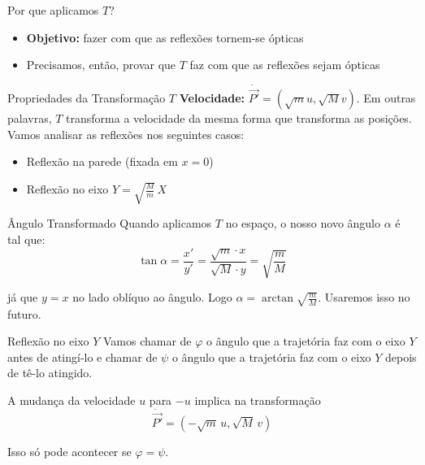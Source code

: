 \documentclass{beamer}
\begin{document}
\begin{frame}{Por que aplicamos $T$?}
  \begin{itemize}
    \item \textbf{Objetivo:} fazer com que as reflexões tornem-se ópticas
    \item Precisamos, então, provar que $T$ faz com que as reflexões sejam ópticas
  \end{itemize}
\end{frame}

\begin{frame}{Propriedades da Transformação $T$}
  \textbf{Velocidade:} ${\dot{\vec{P'}}}=(\sqrt{m}u,\sqrt{M}v)$. Em outras palavras, $T$ transforma a velocidade da mesma
  forma que transforma as posições.
  Vamos analisar as reflexões nos seguintes casos:
  \begin{itemize}
    \item Reflexão na parede (fixada em $x=0$)
    \item Reflexão no eixo $Y=\sqrt{\frac{M}{m}}\,X$
  \end{itemize}
\end{frame}


\begin{frame}{Ângulo Transformado}
  Quando aplicamos $T$ no espaço, o nosso novo ângulo $\alpha$ é tal que: 
  $$\tan{\alpha}=\frac{x'}{y'}=\frac{\sqrt{m}\cdot x}{\sqrt{M}\cdot y}=\sqrt{\frac{m}{M}}$$
  
  já que $y=x$ no lado oblíquo ao ângulo. Logo $\alpha = \arctan{\sqrt{\frac{m}{M}}}$. Usaremos isso no futuro.
\end{frame}

\begin{frame}{Reflexão no eixo $Y$}
  Vamos chamar de $\varphi$ o ângulo que a trajetória faz com o eixo $Y$ antes de atingí-lo e chamar de $\psi$ o ângulo que a trajetória faz com o eixo $Y$ depois de tê-lo atingido. 
  
  A mudança da velocidade $u$ para $-u$ implica na transformação 
  \begin{equation*}
    \dot{\vec{P'}}=(-\sqrt m\,u,\sqrt M\,v)
  \end{equation*}

  Isso só pode acontecer se $\varphi=\psi$.
\end{frame}
\end{document}
